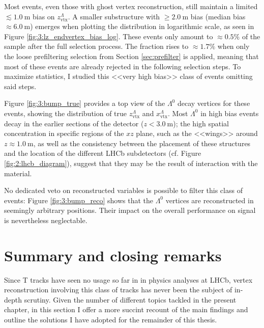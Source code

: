 Most \demonstratorshort events, even those with ghost vertex reconstruction, still maintain a limited $\lesssim \SI{1.0}{\meter}$ bias on $z_\text{vtx}^\Lambda$.
A smaller substructure with $\geq \SI{2.0}{\meter}$ bias (median bias $\approx \SI{6.0}{\meter}$) emerges when plotting the distribution in logarithmic scale, as seen in Figure \ref{fig:3:lz_endvertex_bias_log}.
These events only amount to $\approx 0.5\%$ of the sample after the full selection process.
The fraction rises to $\approx 1.7\%$ when only the loose prefiltering selection from Section \ref{sec:prefilter} is applied, meaning that most of these events are already rejected in the following selection steps.
To maximize statistics, I studied this <<very high bias>> class of events omitting said steps.

Figure \ref{fig:3:bump_true} provides a top view of the $\Lambda^0$ decay vertices for these events, showing the distribution of true $z_\text{vtx}^\Lambda$ and $x_\text{vtx}^\Lambda$.
Most $\Lambda^0$ in high bias events decay in the earlier sections of the detector ($z<\SI{3.0}{\meter}$);
the high spatial concentration in specific regions of the $xz$ plane, such as the <<wings>> around $z\approx \SI{1.0}{\meter}$, as well as the consistency between the placement of these structures and the location of the different LHCb subdetectors (cf. Figure \ref{fig:2:lhcb_diagram}), suggest that they may be the result of interaction with the material.

No dedicated veto on reconstructed variables is possible to filter this class of events:
Figure \ref{fig:3:bump_reco} shows that the $\Lambda^0$ vertices are reconstructed in seemingly arbitrary positions.
Their impact on the overall performance on signal is nevertheless neglectable.

\section{Summary and closing remarks}
\label{sec:3:cap3_conclusions}

Since T tracks have seen no usage so far in in physics analyses at LHCb, vertex reconstruction involving this class of tracks has never been the subject of in-depth scrutiny.
Given the number of different topics tackled in the present chapter, in this section I offer a more succint recount of the main findings and outline the solutions I have adopted for the remainder of this thesis.

